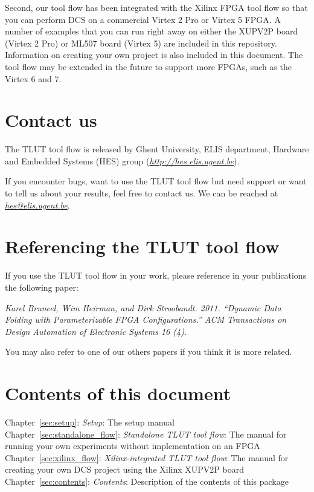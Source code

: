 \documentclass[a4paper,oneside]{memoir}
\begin{document}
Second, our tool flow has been integrated with the Xilinx FPGA tool flow so that you can perform DCS on a commercial Virtex 2 Pro  or Virtex 5 FPGA.
A number of examples that you can run right away on either the XUPV2P board (Virtex 2 Pro) or ML507 board (Virtex 5) are included in this repository. 
Information on creating your own project is also included in this document.
The tool flow may be extended in the future to support more FPGAs, such as the Virtex 6 and 7.

\section{Contact us}
The TLUT tool flow is released by Ghent University, ELIS department, Hardware and Embedded Systems (HES) group (\href{http://hes.elis.ugent.be}{\emph{http://hes.elis.ugent.be}}).

If you encounter bugs, want to use the TLUT tool flow but need support or want to tell us about your results, feel free to contact us.
We can be reached at \href{mailto:hes@elis.ugent.be}{\emph{hes@elis.ugent.be}}.

\section{Referencing the TLUT tool flow}
If you use the TLUT tool flow in your work, please reference in your publications the following paper:

\emph{Karel Bruneel, Wim Heirman, and Dirk Stroobandt. 2011. ``Dynamic Data Folding with Parameterizable FPGA Configurations.'' ACM Transactions on Design Automation of Electronic Systems 16 (4).}

You may also refer to one of our others papers if you think it is more related.

\section{Contents of this document}
Chapter~\ref{sec:setup}: \emph{Setup}: The setup manual\\
Chapter~\ref{sec:standalone_flow}: \emph{Standalone TLUT tool flow}: The manual for running your own experiments without implementation on an FPGA\\
Chapter~\ref{sec:xilinx_flow}: \emph{Xilinx-integrated TLUT tool flow}: The manual for creating your own DCS project using the Xilinx XUPV2P board\\
Chapter~\ref{sec:contents}: \emph{Contents}: Description of the contents of this package\\
\end{document}
